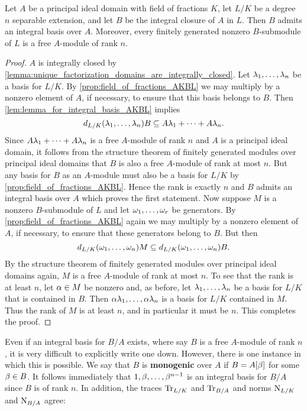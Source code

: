     \begin{theorem}\label{thm:integral_basis_AKBL}
      Let $A$ be a principal ideal domain with field of fractions $K$, let $L/K$ be a degree $n$ separable extension, and let $B$ be the integral closure of $A$ in $L$. Then $B$ admits an integral basis over $A$. Moreover, every finitely generated nonzero $B$-submodule of $L$ is a free $A$-module of rank $n$.
    \end{theorem}
    \begin{proof}
      $A$ is integrally closed by \cref{lemma:unique_factorization_domains_are_integrally_closed}. Let $\lambda_{1},\ldots,\lambda_{n}$ be a basis for $L/K$. By \cref{prop:field_of_fractions_AKBL} we may multiply by a nonzero element of $A$, if necessary, to ensure that this basis belongs to $B$. Then \cref{lem:lemma_for_integral_basis_AKBL} implies
      \[
        d_{L/K}(\lambda_{1},\ldots,\lambda_{n})B \subseteq A\lambda_{1}+\cdots+A\lambda_{n}.
      \]
      Since $A\lambda_{1}+\cdots+A\lambda_{n}$ is a free $A$-module of rank $n$ and $A$ is a principal ideal domain, it follows from the structure theorem of finitely generated modules over principal ideal domains that $B$ is also a free $A$-module of rank at most $n$. But any basis for $B$ as an $A$-module must also be a basis for $L/K$ by \cref{prop:field_of_fractions_AKBL}. Hence the rank is exactly $n$ and $B$ admits an integral basis over $A$ which proves the first statement. Now suppose $M$ is a nonzero $B$-submodule of $L$ and let $\omega_{1},\ldots,\omega_{r}$ be generators. By \cref{prop:field_of_fractions_AKBL} again we may multiply by a nonzero element of $A$, if necessary, to ensure that these generators belong to $B$. But then
      \[
        d_{L/K}(\omega_{1},\ldots,\omega_{n})M \subseteq d_{L/K}(\omega_{1},\ldots,\omega_{n})B.
      \]
      By the structure theorem of finitely generated modules over principal ideal domains again, $M$ is a free $A$-module of rank at most $n$. To see that the rank is at least $n$, let $\alpha \in M$ be nonzero and, as before, let $\lambda_{1},\ldots,\lambda_{n}$ be a basis for $L/K$ that is contained in $B$. Then $\alpha\lambda_{1},\ldots,\alpha\lambda_{n}$ is a basis for $L/K$ contained in $M$. Thus the rank of $M$ is at least $n$, and in particular it must be $n$. This completes the proof.
    \end{proof}

    Even if an integral basis for $B/A$ exists, where say $B$ is a free $A$-module of rank $n$, it is very difficult to explicitly write one down. However, there is one instance in which this is possible. We say that $B$ is \textbf{monogenic} over $A$ if $B = A[\beta]$ for some $\beta \in B$. It follows immediately that $1,\beta,\ldots,\beta^{n-1}$ is an integral basis for $B/A$ since $B$ is of rank $n$. In addition, the traces $\operatorname{\mathrm{Tr}}_{L/K}$ and $\operatorname{\mathrm{Tr}}_{B/A}$ and norms $\operatorname{\mathrm{N}}_{L/K}$ and $\operatorname{\mathrm{N}}_{B/A}$ agree:

